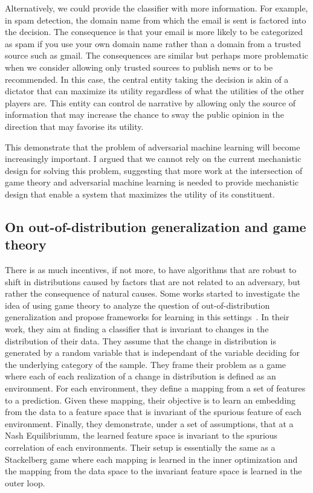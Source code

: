 Alternatively, we could provide the classifier with more information. For example, in spam detection, the domain name from which the email is sent
is factored into the decision. The consequence is that your email is more likely to be categorized as spam if you use your own domain name rather than a domain
from a trusted source such as gmail. The consequences are similar but perhaps more problematic when we consider allowing only trusted sources to publish news
or to be recommended. In this case, the central entity taking the decision is akin of a dictator that can maximize its utility regardless of what the utilities
of the other players are. This entity can control de narrative by allowing only the source of information that may increase the chance to sway the public
opinion in the direction that may favorise its utility.

This demonstrate that the problem of adversarial machine learning will become increasingly important. I argued that we
cannot rely on the current mechanistic design for solving this problem, suggesting that more work at the intersection
of game theory and adversarial machine learning is needed to provide mechanistic design that enable a system that maximizes
the utility of its constituent.

\subsection{On out-of-distribution generalization and game theory}
There is as much incentives, if not more, to have algorithms that are robust to shift in distributions caused by factors that are not
related to an adversary, but rather the consequence of natural causes. Some works started to investigate the idea of using
game theory to analyze the question of out-of-distribution generalization and propose frameworks for learning in this settings~\cite{ahuja2020invariant,ahuja2020linear}.
In their work, they aim at finding a classifier that is invariant to changes in the distribution of their data. They assume that the change in distribution is generated
by a random variable that is independant of the variable deciding for the underlying category of the sample.
They frame their problem as a game where each of each realization of a change in distribution is defined as an environment. For each environment, they define
a mapping from a set of features to a prediction. Given these mapping, their objective is to learn an embedding from the data to a feature space that is
invariant of the spurious feature of each environment. Finally, they demonstrate, under a set of assumptions, that at a Nash Equilibriumm, the learned feature space is invariant
to the spurious correlation of each environments. Their setup is essentially the same as a Stackelberg game where each mapping is learned in the inner optimization and the
mapping from the data space to the invariant feature space is learned in the outer loop.

